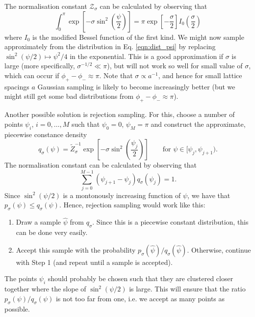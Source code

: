 \documentclass[11pt]{article}
\begin{document}
The normalisation constant $\mathcal{Z}_\sigma$ can be calculated by observing that
\begin{equation*}
  \int_0^{\pi} \exp\left[-\sigma\sin^2\left(\frac{\psi}{2}\right)\right] = \pi \exp\left[-\frac{\sigma}{2}\right]I_0\left(\frac{\sigma}{2}\right)
\end{equation*}
where $I_0$ is the modified Bessel function of the first kind. We might now sample approximately from the distribution in Eq. \eqref{eqn:dist_psi} by replacing $\sin^2(\psi/2)\mapsto \psi^2/4$ in the exponential. This is a good approximation if $\sigma$ is large (more specifically, $\sigma^{-1/2}\ll\pi$), but will not work so well for small value of $\sigma$, which can occur if $\phi_+-\phi_-\approx \pi$. Note that $\sigma\propto a^{-1}$, and hence for small lattice spacings $a$ Gaussian sampling is likely to become increasingly better (but we might still get some bad distributions from $\phi_+-\phi_-\approx\pi$).

Another possible solution is rejection sampling. For this, choose a number of points $\psi_i$, $i=0,\dots,M$ such that $\psi_0=0$, $\psi_M=\pi$ and construct the approximate, piecewise constance density
\begin{equation}
q_\sigma(\psi) = \tilde{Z}_{\sigma}^{-1} \exp\left[
-\sigma \sin^2\left(\frac{\psi_j}{2}\right)
\right]\qquad\text{for $\psi\in[\psi_{j},\psi_{j+1})$.}
\end{equation}
The normalisation constant can be calculated by observing that
\begin{equation*}
\sum_{j=0}^{M-1} (\psi_{j+1}-\psi_j) q_\sigma(\psi_j) = 1.
\end{equation*}
Since $\sin^2(\psi/2)$ is a montonously increasing function of $\psi$, we have that $p_\sigma(\psi)\le q_\sigma(\psi)$. Hence, rejection sampling would work like this:
\begin{enumerate}
\item Draw a sample $\hat{\psi}$ from $q_\sigma$. Since this is a piecewise constant distribution, this can be done very easily.
  \item Accept this sample with the probability $p_\sigma(\hat{\psi})/q_\sigma(\hat{\psi})$. Otherwise, continue with Step 1 (and repeat until a sample is accepted).
\end{enumerate}
The points $\psi_i$ should probably be chosen such that they are clustered closer together where the slope of $\sin^2(\psi/2)$ is large. This will ensure that the ratio $p_\sigma(\psi)/q_\sigma(\psi)$ is not too far from one, i.e. we accept as many points as possible.


\end{document}
